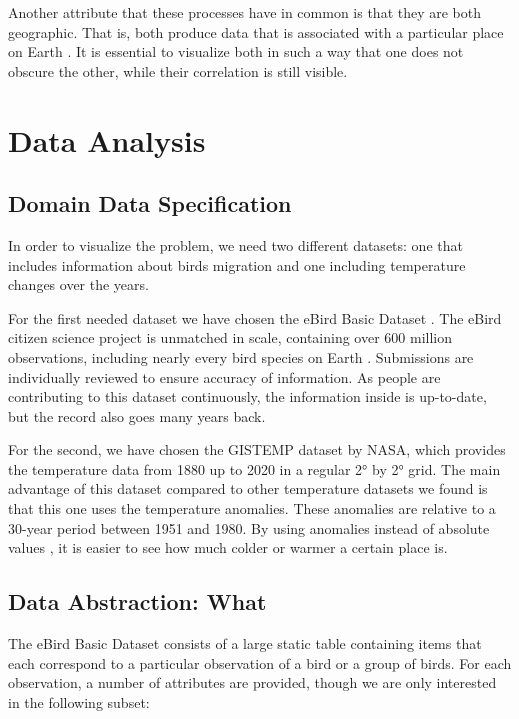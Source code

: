 \documentclass[journal]{vgtc}                %
\begin{document}
Another attribute that these processes have in common is that they are both geographic. That is, both produce data that is associated with a particular place on Earth \cite{iso2014geo}. It is essential to visualize both in such a way that one does not obscure the other, while their correlation is still visible.

\section{Data Analysis}

\subsection{Domain Data Specification}

In order to visualize the problem, we need two different datasets: one that includes information about birds migration and one including temperature changes over the years.

For the first needed dataset we have chosen the eBird Basic Dataset \cite{ebird2020data}. The eBird citizen science project is unmatched in scale, containing over 600 million observations, including nearly every bird species on Earth \cite{strimas2020ebird}. Submissions are individually reviewed to ensure accuracy of information. As people are contributing to this dataset continuously, the information inside is up-to-date, but the record also goes many years back.

For the second, we have chosen the GISTEMP dataset \cite{gistemp} by NASA, which provides the temperature data from 1880 up to 2020 in a regular 2° by 2° grid. The main advantage of this dataset compared to other temperature datasets we found is that this one uses the temperature anomalies. These anomalies are relative to a 30-year period between 1951 and 1980. By using anomalies instead of absolute values \cite{gistempanomalies}, it is easier to see how much colder or warmer a certain place is. 

\subsection{Data Abstraction: What}
\label{subsec:data-abs-what}

The eBird Basic Dataset \cite{ebird2020data} consists of a large static table containing items that each correspond to a particular observation of a bird or a group of birds. For each observation, a number of attributes are provided, though we are only interested in the following subset:
\end{document}
